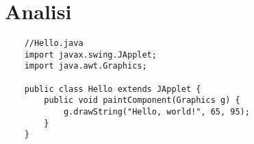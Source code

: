 \chapter{Analisi}

\begin{lstlisting}
	//Hello.java
	import javax.swing.JApplet;
	import java.awt.Graphics;
	
	public class Hello extends JApplet {
		public void paintComponent(Graphics g) {
			g.drawString("Hello, world!", 65, 95);
		}    
	}
\end{lstlisting}